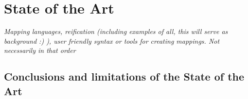 \chapter{State of the Art}
\label{chapter:sota}

\textit{Mapping languages, reification (including examples of all, this will serve as background :) ), user friendly syntax or tools for creating mappings. Not necessarily in that order}







\section{Conclusions and limitations of the State of the Art}